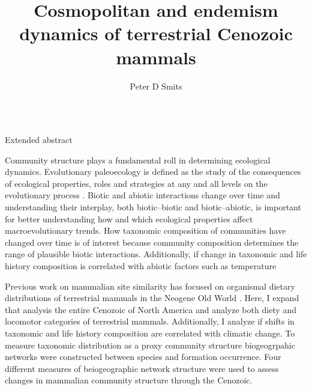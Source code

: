 \documentclass[final]{beamer}\usepackage[]{graphicx}\usepackage[]{color}
\title{Cosmopolitan and endemism dynamics of terrestrial Cenozoic mammals}
\author{Peter D Smits}
\institute{Committee on Evolutionary Biology, University of Chicago}
\newlength{\onecolwid}
\begin{document}
\begin{frame}[t]
  \begin{columns}[t]
    \begin{column}{\onecolwid}
    \begin{block}{Extended abstract}
%

        Community structure plays a fundamental roll in determining ecological dynamics. 
        Evolutionary paleoecology is defined as the study of the consequences of ecological properties, roles and strategies at any and all levels on the evolutionary process \citep{Kitchell1985a}. Biotic and abiotic interactions change over time and understanding their interplay, both biotic--biotic and biotic--abiotic, is important for better understanding how and which ecological properties affect macroevolutionary trends.
        How taxonomic composition of communities have changed over time is of interest because community composition determines the range of plausible biotic interactions. Additionally, if change in taxonomic and life history composition is correlated with abiotic factors such as temperature %

        Previous work on mammalian site similarity has focused on organismal dietary distributions of terrestrial mammals in the Neogene Old World \citep{Jernvall2002,Jernvall2004}. 
        Here, I expand that analysis the entire Cenozoic of North America and analyze both diety and locomotor categories of terrestrial mammals. Additionally, I analyze if shifts in taxonomic and life history composition are correlated with climatic change.
        To measure taxonomic distribution as a proxy community structure biogeogrpahic networks were constructed between species and formation occurrence. Four different measures of beiogeographic network structure were used to assess changes in mammalian community structure through the Cenozoic.
      \end{block}


\end{column}
\end{columns}
\end{frame}
\end{document}
